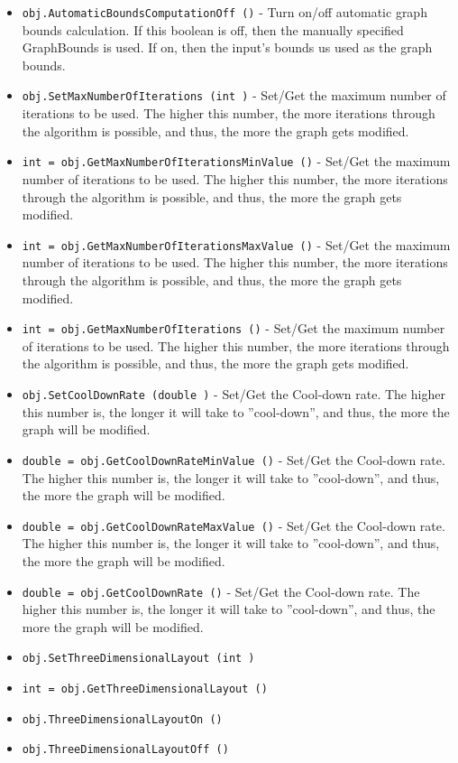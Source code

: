 \begin{itemize}
\item  \verb|obj.AutomaticBoundsComputationOff ()| -  Turn on/off automatic graph bounds calculation. If this
 boolean is off, then the manually specified GraphBounds is used.
 If on, then the input's bounds us used as the graph bounds.

\item  \verb|obj.SetMaxNumberOfIterations (int )| -  Set/Get the maximum number of iterations to be used.
 The higher this number, the more iterations through the algorithm
 is possible, and thus, the more the graph gets modified.

\item  \verb|int = obj.GetMaxNumberOfIterationsMinValue ()| -  Set/Get the maximum number of iterations to be used.
 The higher this number, the more iterations through the algorithm
 is possible, and thus, the more the graph gets modified.

\item  \verb|int = obj.GetMaxNumberOfIterationsMaxValue ()| -  Set/Get the maximum number of iterations to be used.
 The higher this number, the more iterations through the algorithm
 is possible, and thus, the more the graph gets modified.

\item  \verb|int = obj.GetMaxNumberOfIterations ()| -  Set/Get the maximum number of iterations to be used.
 The higher this number, the more iterations through the algorithm
 is possible, and thus, the more the graph gets modified.

\item  \verb|obj.SetCoolDownRate (double )| -  Set/Get the Cool-down rate.
 The higher this number is, the longer it will take to ''cool-down'',
 and thus, the more the graph will be modified.

\item  \verb|double = obj.GetCoolDownRateMinValue ()| -  Set/Get the Cool-down rate.
 The higher this number is, the longer it will take to ''cool-down'',
 and thus, the more the graph will be modified.

\item  \verb|double = obj.GetCoolDownRateMaxValue ()| -  Set/Get the Cool-down rate.
 The higher this number is, the longer it will take to ''cool-down'',
 and thus, the more the graph will be modified.

\item  \verb|double = obj.GetCoolDownRate ()| -  Set/Get the Cool-down rate.
 The higher this number is, the longer it will take to ''cool-down'',
 and thus, the more the graph will be modified.

\item  \verb|obj.SetThreeDimensionalLayout (int )|

\item  \verb|int = obj.GetThreeDimensionalLayout ()|

\item  \verb|obj.ThreeDimensionalLayoutOn ()|

\item  \verb|obj.ThreeDimensionalLayoutOff ()|

\end{itemize}
